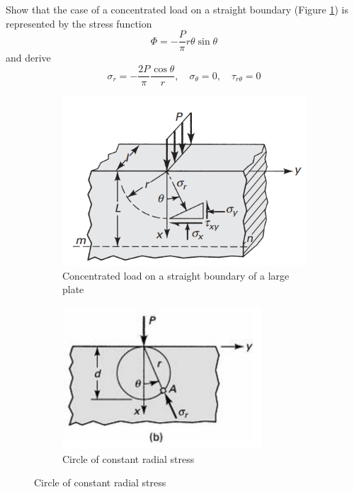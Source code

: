 \section{}
Show that the case of a concentrated load on a straight boundary (Figure \ref{fig:Q1aProblemDiagram}) is represented by the
stress function
\begin{equation*}
    \Phi = -\frac{P}{\pi} r \theta \sin\theta
\end{equation*}
and derive 
\begin{equation*}
    \sigma_r = - \frac{2P}{\pi} \frac{\cos\theta}{r}, \quad \sigma_\theta = 0, \quad \tau_{r\theta} = 0
\end{equation*}
\begin{figure}[h]
    \centering
    \begin{subfigure}[t]{0.35\linewidth}
        \centering
        \includegraphics[width=\linewidth]{Questions/Figures/Q1aProblemDiagram.png}
        \caption{Concentrated load on a straight boundary of a large plate}
        \label{fig:Q1aProblemDiagram}
    \end{subfigure}
    \begin{subfigure}[t]{0.35\linewidth}
        \centering
        \includegraphics[width=\linewidth]{Questions/Figures/Q1bProblemDiagram.png}
        \caption{Circle of constant radial stress}
        \label{fig:Q1bProblemDiagram}
    \end{subfigure}
    \label{fig:Q1ProblemDiagrams}
\end{figure}

